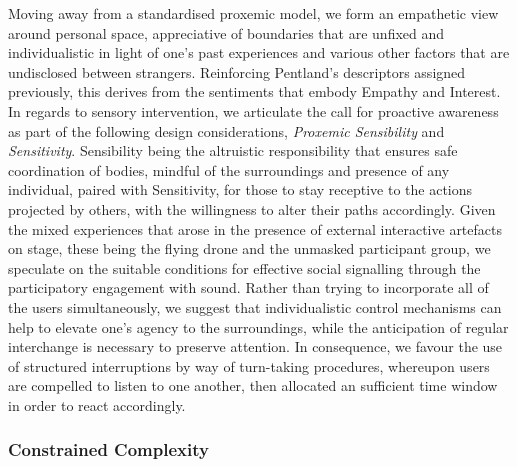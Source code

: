 Moving away from a standardised proxemic model, we form an empathetic view around personal space, appreciative of boundaries that are unfixed and individualistic in light of one's past experiences and various other factors that are undisclosed between strangers. Reinforcing Pentland's descriptors assigned previously, this derives from the sentiments that embody Empathy and Interest. In regards to sensory intervention, we articulate the call for proactive awareness as part of the following design considerations, \textit{Proxemic Sensibility} and \textit{Sensitivity}. Sensibility being the altruistic responsibility that ensures safe coordination of bodies, mindful of the surroundings and presence of any individual, paired with Sensitivity, for those to stay receptive to the actions projected by others, with the willingness to alter their paths accordingly. Given the mixed experiences that arose in the presence of external interactive artefacts on stage, these being the flying drone and the unmasked participant group, we speculate on the suitable conditions for effective social signalling through the participatory engagement with sound. Rather than trying to incorporate all of the users simultaneously, we suggest that individualistic control mechanisms can help to elevate one's agency to the surroundings, while the anticipation of regular interchange is necessary to preserve attention. In consequence, we favour the use of structured interruptions by way of turn-taking procedures, whereupon users are compelled to listen to one another, then allocated an sufficient time window in order to react accordingly.

\subsubsection{Constrained Complexity}
\label{subsec:discussion_complexity}

